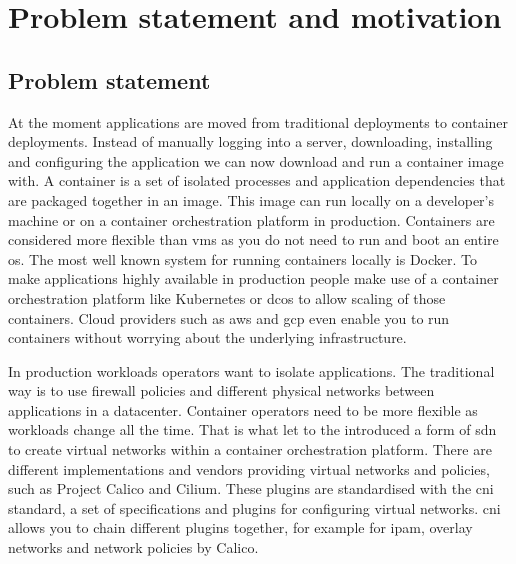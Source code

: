 \chapter{Problem statement and motivation}
\label{chap:problem}

\section{Problem statement}
\label{sec:problem-statement}
At the moment applications are moved from traditional deployments to container deployments. Instead of manually logging into a server, downloading, installing and configuring the application we can now download and run a container image with. A container is a set of isolated processes and application dependencies that are packaged together in an image. This image can run locally on a developer's machine or on a container orchestration platform in production. Containers are considered more flexible than \glspl{vm} as you do not need to run and boot an entire \gls{os}. The most well known system for running containers locally is Docker\cite{docker}. To make applications highly available in production people make use of a container orchestration platform like Kubernetes\cite{kubernetes} or \gls{dcos}\cite{dcos} to allow scaling of those containers. Cloud providers such as \gls{aws}\cite{aws} and \gls{gcp}\cite{gcp} even enable you to run containers without worrying about the underlying infrastructure.

In production workloads operators want to isolate applications. The traditional way is to use firewall policies and different physical networks between applications in a datacenter. Container operators need to be more flexible as workloads change all the time. That is what let to the introduced a form of \gls{sdn} to create virtual networks within a container orchestration platform.  There are different implementations and vendors providing virtual networks and policies, such as Project Calico\cite{calico} and Cilium\cite{cilium}. These plugins are standardised with the \gls{cni}\cite{cni} standard, a set of specifications and plugins for configuring virtual networks. \Gls{cni} allows you to chain different plugins together, for example for \gls{ipam}, overlay networks and network policies by Calico.

